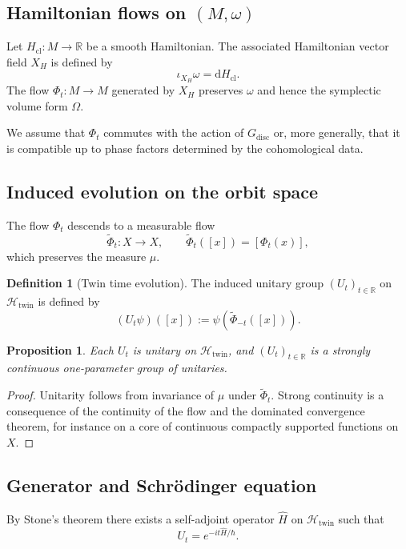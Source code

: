 \documentclass[11pt]{article}
\numberwithin{equation}{section}
\newtheorem{proposition}[theorem]{Proposition}
\theoremstyle{definition}
\newtheorem{definition}[theorem]{Definition}
\theoremstyle{remark}
\newcommand{\R}{\mathbb{R}}
\newcommand{\dd}{\mathrm{d}}
\newcommand{\Htw}{\mathcal{H}_{\mathrm{twin}}}
\newcommand{\Gdisc}{G_{\mathrm{disc}}}
\begin{document}
	\subsection{Hamiltonian flows on $(M,\omega)$}
	
	Let $H_{\mathrm{cl}}:M\to\R$ be a smooth Hamiltonian. The associated
	Hamiltonian vector field $X_H$ is defined by
	\[
	\iota_{X_H}\omega = \dd H_{\mathrm{cl}}.
	\]
	The flow $\Phi_t:M\to M$ generated by $X_H$ preserves $\omega$ and
	hence the symplectic volume form $\Omega$.
	
	We assume that $\Phi_t$ commutes with the action of $\Gdisc$ or, more
	generally, that it is compatible up to phase factors determined by the
	cohomological data.
	
	\subsection{Induced evolution on the orbit space}
	
	The flow $\Phi_t$ descends to a measurable flow
	\[
	\tilde{\Phi}_t : X \to X,\qquad \tilde{\Phi}_t([x]) = [\Phi_t(x)],
	\]
	which preserves the measure $\mu$.
	
	\begin{definition}[Twin time evolution]
		The induced unitary group $(U_t)_{t\in\R}$ on $\Htw$ is defined by
		\[
		(U_t\psi)([x]) := \psi(\tilde{\Phi}_{-t}([x])).
		\]
	\end{definition}
	
	\begin{proposition}
		Each $U_t$ is unitary on $\Htw$, and $(U_t)_{t\in\R}$ is a strongly
		continuous one-parameter group of unitaries.
	\end{proposition}
	
	\begin{proof}
		Unitarity follows from invariance of $\mu$ under $\tilde{\Phi}_t$.
		Strong continuity is a consequence of the continuity of the flow and the
		dominated convergence theorem, for instance on a core of continuous
		compactly supported functions on $X$.
	\end{proof}
	
	\subsection{Generator and Schr\"odinger equation}
	
	By Stone's theorem there exists a self-adjoint operator $\widehat{H}$
	on $\Htw$ such that
	\[
	U_t = e^{-i t \widehat{H}/\hbar}.
	\]
	
\end{document}
